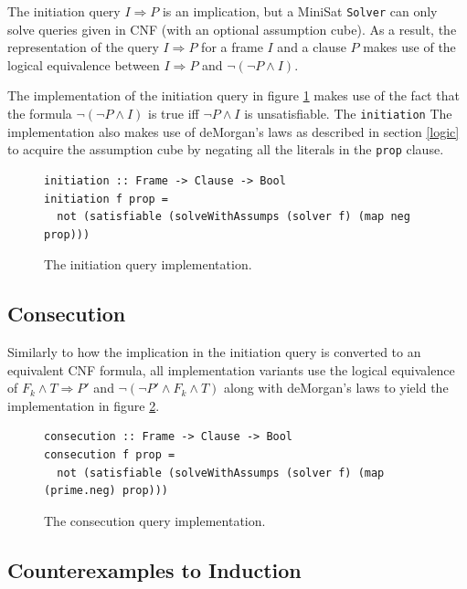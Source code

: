 \documentclass[12pt,a4paper,twoside,openright]{report}
\begin{document}
{The initiation query $I \Rightarrow P$ is an implication, but a MiniSat \verb,Solver, can only
solve queries given in CNF (with an optional assumption cube). As a result, the representation
of the query $I \Rightarrow P$ for a frame $I$ and a clause $P$ makes use of the logical equivalence between
$I \Rightarrow P$ and $\neg (\neg P \wedge I)$.

The implementation of the initiation query in figure \ref{impl:initiation} makes use of
the fact that the formula $\neg (\neg P \wedge I)$ is true iff $\neg P \wedge I$ is unsatisfiable.
The \verb,initiation,
The implementation also makes use of deMorgan's laws as described in section
\ref{logic} to acquire the assumption cube by negating all the literals in the \verb,prop, clause.

\begin{figure}[H]
\begin{verbatim}
initiation :: Frame -> Clause -> Bool
initiation f prop =
  not (satisfiable (solveWithAssumps (solver f) (map neg prop)))
\end{verbatim}
\caption{The initiation query implementation.}
\label{impl:initiation}
\end{figure}

\subsection{Consecution}

Similarly to how the implication in the initiation query is converted to an equivalent CNF
formula, all implementation variants use the logical equivalence of
$F_k \wedge T \Rightarrow P'$ and $\neg (\neg P' \wedge F_k \wedge T)$ along with deMorgan's
laws to yield the implementation in figure \ref{impl:consecution}.

\begin{figure}[H]
\begin{verbatim}
consecution :: Frame -> Clause -> Bool
consecution f prop =
  not (satisfiable (solveWithAssumps (solver f) (map (prime.neg) prop)))
\end{verbatim}
\caption{The consecution query implementation.}
\label{impl:consecution}
\end{figure}

\subsection{Counterexamples to Induction}

}
\end{document}
